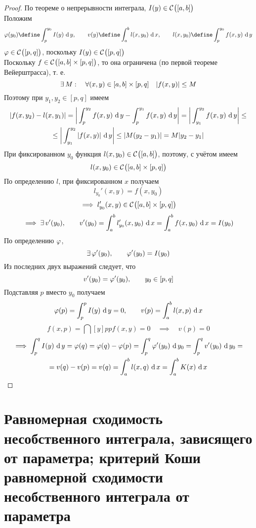 \begin{proof}
	По теореме о непрерывности интеграла, $ I(y) \in \Cont{[a, b]} $ \\
	Положим
	$$ \vphi(y_0) \define \dint[y]{p}{y_0}{I(y)}, \qquad v(y) \define \dint{a}b{l(x, y_0)}, \qquad l(x, y_0) \define \dint[y]{p}{y_0}{f(x, y)} $$
	$ \vphi \in \Cont{[p, q]} $, поскольку $ I(y) \in \Cont{[p, q]} $ \\
	Поскольку $ f \in \Cont{[a, b] \times [p, q]} $, то она ограничена (по первой теореме Вейерштрасса), т. е.
	$$ \exist M : \quad \forall (x, y) \in [a, b] \times [p, q] \quad |f(x, y)| \le M $$
	Поэтому при $ y_1, y_2 \in [p, q] $ имеем
	\begin{multline}\lbl{par_int:24}
		|f(x, y_2) - l(x, y_1)| = \bigg| \dint[y]{p}{y_2}{f(x, y)} - \dint[y]{p}{y_1}{f(x, y)} \bigg| = \bigg| \dint[y]{y_1}{y_2}{f(x, y)} \bigg| \le \\
		\le \bigg| \dint[y]{y_1}{y_2}{|f(x, y)|} \bigg| \le |M(y_2 - y_1)| = M|y_2 - y_1|
	\end{multline}
	При фиксированном $ y_0 $ функция $ l(x, y_0) \in \Cont{[a, b]} $, поэтому, с учётом  имеем
	$$ l(x, y_0) \in \Cont{[a, b] \times [p, q]} $$
	По определению $ l $, при фиксированном $ x $ получаем
	$$ l_{y_0}'(x, y) = f(x, y_0) $$
	$$ \implies l_{y_0}'(x, y) \in \Cont{[a, b] \times [p, q]} $$
	$$ \implies \exist v'(y_0), \qquad v'(y_0) = \dint{a}b{l_{y_0}'(x, y_0)} = \dint{a}b{f(x, y_0)} = I(y_0) $$
	По определению $ \vphi $,
	$$ \exist \vphi'(y_0), \qquad \vphi'(y_0) = I(y_0) $$
	Из последних двух выражений следует, что
	$$ v'(y_0) = \vphi'(y_0), \qquad y_0 \in [p, q] $$
	Подставляя $ p $ вместо $ y_0 $ получаем
	$$ \vphi(p) = \dint[y]{p}p{I(y)} = 0, \qquad v(p) = \dint{a}b{l(x, p)} $$
	$$ f(x, p) = \dint[y]{p}p{f(x, y)} = 0 \quad \implies \quad v(p) = 0 $$
	\begin{multline*}
		\implies \dint[y]pq{I(y)} = \vphi(q) = \vphi(q) - \vphi(p) = \dint[y_0]pq{\vphi'(y_0)} = \dint[y_0]{p}q{v'(y_0)} = \\
		= v(q) - v(p) = v(q) = \dint{a}b{l(x, q)} = \dint{a}b{K(x)}
	\end{multline*}
\end{proof}

\section{Равномерная сходимость несобственного интеграла, зависящего от параметра; критерий Коши равномерной сходимости несобственного интеграла от параметра}

